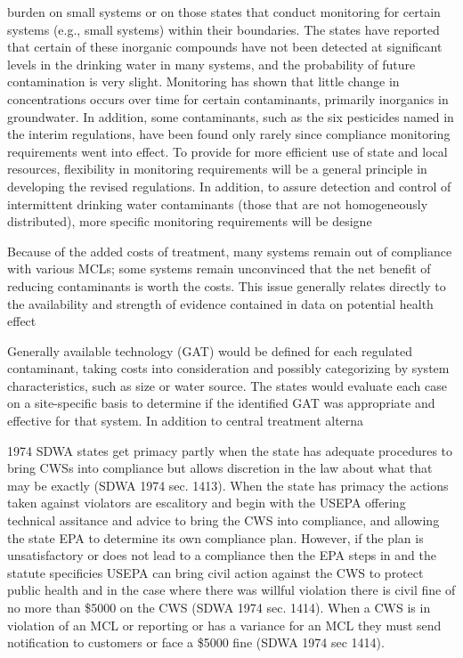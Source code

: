 burden on small systems or on those
states that conduct monitoring for certain systems (e.g., small systems) within
their boundaries. The states have reported that certain of these inorganic
compounds have not been detected at
significant levels in the drinking water
in many systems, and the probability of
future contamination is very slight.
Monitoring has shown that little change
in concentrations occurs over time for
certain contaminants, primarily inorganics in groundwater. In addition, some
contaminants, such as the six pesticides
named in the interim regulations, have
been found only rarely since compliance
monitoring requirements went into
effect.
To provide for more efficient use of
state and local resources, flexibility in
monitoring requirements will be a general principle in developing the revised
regulations. In addition, to assure detection and control of intermittent drinking
water contaminants (those that are not
homogeneously distributed), more specific monitoring requirements will be
designe

Because of the added costs of
treatment, many systems remain out of
compliance with various MCLs; some
systems remain unconvinced that the
net benefit of reducing contaminants is
worth the costs. This issue generally
relates directly to the availability and
strength of evidence contained in data
on potential health effect

Generally available technology (GAT)
would be defined for each regulated
contaminant, taking costs into consideration and possibly categorizing by
system characteristics, such as size or
water source. The states would evaluate
each case on a site-specific basis to
determine if the identified GAT was
appropriate and effective for that system.
In addition to central treatment alterna

1974 SDWA states get primacy partly when the state has adequate procedures to bring CWSs into compliance but allows discretion in the law about what that may be exactly (SDWA 1974 sec. 1413). When the state has primacy the actions taken against violators are escalitory and begin with the USEPA offering technical assitance and advice to bring the CWS into compliance, and allowing the state EPA to determine its own compliance plan. However, if the plan is unsatisfactory or does not lead to a compliance then the EPA steps in and the statute specificies USEPA can bring civil action against the CWS to protect public health and in the case where there was willful violation there is civil fine of no more than \$5000 on the CWS (SDWA 1974 sec. 1414). When a CWS is in violation of an MCL or reporting or has a variance for an MCL they must send notification to customers or face a \$5000 fine (SDWA 1974 sec 1414). 


